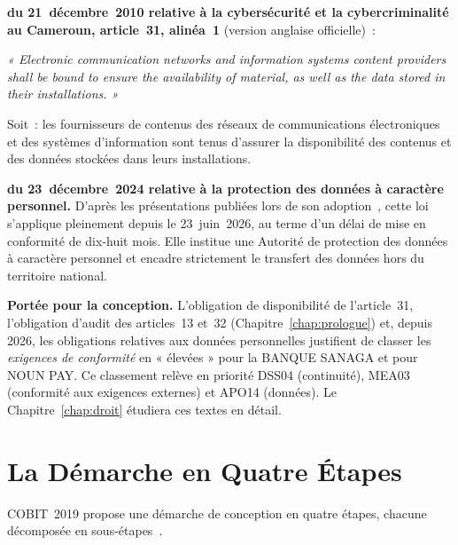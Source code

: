 \begin{boxjuris}
\textbf{ du 21~décembre~2010 relative à la
cybersécurité et la cybercriminalité au Cameroun, article~31, alinéa~1}
(version anglaise officielle)~:

\medskip
\textit{« Electronic communication networks and information systems
content providers shall be bound to ensure the availability of material,
as well as the data stored in their installations. »}

\medskip
Soit~: les fournisseurs de contenus des réseaux de communications
électroniques et des systèmes d'information sont tenus d'assurer la
disponibilité des contenus et des données stockées dans leurs
installations.

\medskip
\textbf{ du 23~décembre~2024 relative à la protection
des données à caractère personnel.} D'après les présentations publiées
lors de son adoption~\cite{cio2026donnees}, cette loi s'applique
pleinement depuis le 23~juin~2026, au terme d'un délai de mise en
conformité de dix-huit mois. Elle institue une Autorité de protection des
données à caractère personnel et encadre strictement le transfert des
données hors du territoire national.

\medskip
\textbf{Portée pour la conception.} L'obligation de disponibilité de
l'article~31, l'obligation d'audit des articles~13 et~32
(Chapitre~\ref{chap:prologue}) et, depuis 2026, les obligations relatives
aux données personnelles justifient de classer les \emph{exigences de
conformité} en « élevées » pour la BANQUE SANAGA et pour NOUN PAY. Ce
classement relève en priorité DSS04 (continuité), MEA03 (conformité aux
exigences externes) et APO14 (données). Le Chapitre~\ref{chap:droit}
étudiera ces textes en détail.
\end{boxjuris}

\section{La Démarche en Quatre Étapes}
\label{sec:c07-etapes}

COBIT~2019 propose une démarche de conception en quatre étapes, chacune
décomposée en sous-étapes~\cite{isaca2018cobitintro}.

